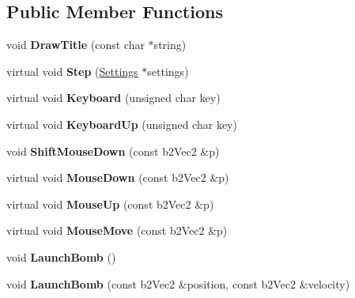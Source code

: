 \subsection*{Public Member Functions}
\begin{DoxyCompactItemize}
\item 
\hypertarget{classTest_adc34013ff19f072ebc1cff1fe8fadb51}{void {\bfseries Draw\-Title} (const char $\ast$string)}\label{classTest_adc34013ff19f072ebc1cff1fe8fadb51}

\item 
\hypertarget{classTest_af17783fea09eebb98fc500af85f2d330}{virtual void {\bfseries Step} (\hyperlink{structSettings}{Settings} $\ast$settings)}\label{classTest_af17783fea09eebb98fc500af85f2d330}

\item 
\hypertarget{classTest_a794e4d4a30c1e7f13b62eb775e59c012}{virtual void {\bfseries Keyboard} (unsigned char key)}\label{classTest_a794e4d4a30c1e7f13b62eb775e59c012}

\item 
\hypertarget{classTest_ab318e010754ba899e7fa646d6f22c1ab}{virtual void {\bfseries Keyboard\-Up} (unsigned char key)}\label{classTest_ab318e010754ba899e7fa646d6f22c1ab}

\item 
\hypertarget{classTest_aefa1d0ec080ed52b0a6b37664b6f75cd}{void {\bfseries Shift\-Mouse\-Down} (const b2\-Vec2 \&p)}\label{classTest_aefa1d0ec080ed52b0a6b37664b6f75cd}

\item 
\hypertarget{classTest_aa6382879085349085ffd17e212cfa52b}{virtual void {\bfseries Mouse\-Down} (const b2\-Vec2 \&p)}\label{classTest_aa6382879085349085ffd17e212cfa52b}

\item 
\hypertarget{classTest_a6b9adb9e42c85a5519ab31cd57063da7}{virtual void {\bfseries Mouse\-Up} (const b2\-Vec2 \&p)}\label{classTest_a6b9adb9e42c85a5519ab31cd57063da7}

\item 
\hypertarget{classTest_a043a2d8dea5248b839c501e03df97475}{virtual void {\bfseries Mouse\-Move} (const b2\-Vec2 \&p)}\label{classTest_a043a2d8dea5248b839c501e03df97475}

\item 
\hypertarget{classTest_a3f004c3be556e7765e39c59ba1561441}{void {\bfseries Launch\-Bomb} ()}\label{classTest_a3f004c3be556e7765e39c59ba1561441}

\item 
\hypertarget{classTest_a433791c82ebf92a7e9c1b35463158008}{void {\bfseries Launch\-Bomb} (const b2\-Vec2 \&position, const b2\-Vec2 \&velocity)}\label{classTest_a433791c82ebf92a7e9c1b35463158008}


\end{DoxyCompactItemize}
